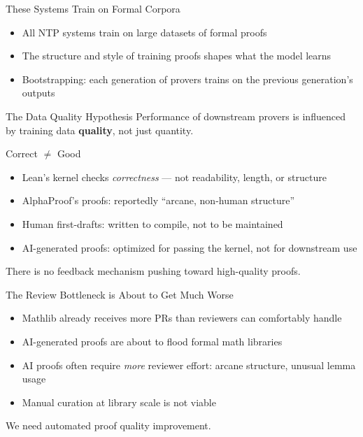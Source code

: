 \documentclass{beamer}
\begin{document}
\begin{frame}{These Systems Train on Formal Corpora}
\vspace{0.8em}
\begin{itemize}\setlength{\itemsep}{10pt}
  \item All NTP systems train on large datasets of formal proofs
  \item The structure and style of training proofs shapes what the model learns
  \item Bootstrapping: each generation of provers trains on the previous generation's outputs
\end{itemize}
\vspace{0.8em}
\begin{alertblock}{The Data Quality Hypothesis}
  \centering Performance of downstream provers is influenced by training data \textbf{quality}, not just quantity.
\end{alertblock}
\end{frame}

\begin{frame}{Correct $\neq$ Good}
\vspace{0.5em}
\begin{itemize}\setlength{\itemsep}{8pt}
  \item Lean's kernel checks \emph{correctness} --- not readability, length, or structure
  \item AlphaProof's proofs: reportedly ``arcane, non-human structure''
  \item Human first-drafts: written to compile, not to be maintained
  \item AI-generated proofs: optimized for passing the kernel, not for downstream use
\end{itemize}
\vspace{0.5em}
\begin{exampleblock}{}
  \centering There is no feedback mechanism pushing toward high-quality proofs.
\end{exampleblock}
\end{frame}

\begin{frame}{The Review Bottleneck is About to Get Much Worse}
\vspace{0.8em}
\begin{itemize}\setlength{\itemsep}{10pt}
  \item Mathlib already receives more PRs than reviewers can comfortably handle
  \item AI-generated proofs are about to flood formal math libraries
  \item AI proofs often require \emph{more} reviewer effort: arcane structure, unusual lemma usage
  \item Manual curation at library scale is not viable
\end{itemize}
\vspace{0.8em}
\begin{alertblock}{}
  \centering We need automated proof quality improvement.
\end{alertblock}
\end{frame}
\end{document}
